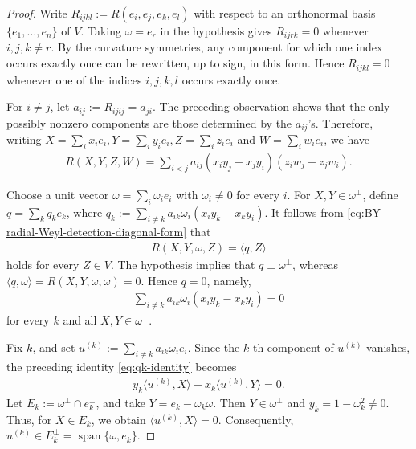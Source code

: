\documentclass[10pt,a4paper]{amsart}
\begin{document}
	\begin{proof}
		Write $R_{ijkl}:=R(e_i,e_j,e_k,e_l)$ with respect to an orthonormal
		basis $\{e_1,\ldots,e_n\}$ of $V$. Taking $\omega=e_r$ in the
		hypothesis gives $R_{ijrk}=0$ whenever $i,j,k\neq r$. By the curvature
		symmetries, any component for which one index occurs exactly once can
		be rewritten, up to sign, in this form. Hence $R_{ijkl}=0$ whenever
		one of the indices $i,j,k,l$ occurs exactly once.
		
		For $i\neq j$, let $a_{ij}:=R_{ijij}=a_{ji}$. The preceding observation
		shows that the only possibly nonzero components are those determined by
		the $a_{ij}$'s. Therefore, writing $X=\sum_i x_i e_i,Y=\sum_i y_i e_i,Z=\sum_i z_i e_i$ and $W=\sum_i w_i e_i$, we have
		\begin{align}
			\label{eq:BY-radial-Weyl-detection-diagonal-form}
			R(X,Y,Z,W)
			=
			\sum_{i<j}
			a_{ij}
			(x_i y_j-x_j y_i)
			(z_i w_j-z_j w_i).
		\end{align}
		
		Choose a unit vector $\omega=\sum_i\omega_i e_i$ with $\omega_i\neq0$
		for every $i$. For $X,Y\in\omega^\perp$, define
		$q=\sum_k q_k e_k$, where $q_k:=\sum_{i\neq k}a_{ik}\omega_i(x_i y_k-x_k y_i)$. It follows from
		\eqref{eq:BY-radial-Weyl-detection-diagonal-form} that
		\begin{align*}
			R(X,Y,\omega,Z)=\langle q,Z\rangle
		\end{align*}
		holds for every $Z\in V$. The hypothesis
		implies that $q\perp\omega^\perp$, whereas
		$\langle q,\omega\rangle=R(X,Y,\omega,\omega)=0$. Hence $q=0$, namely,
		\begin{align}\label{eq:qk-identity}
			\sum_{i\neq k}
			a_{ik}\omega_i
			(x_i y_k-x_k y_i)
			=
			0
		\end{align}
		for every $k$ and all $X,Y\in\omega^\perp$.
		
		Fix $k$, and set $u^{(k)}:=\sum_{i\neq k}a_{ik}\omega_i e_i$. Since the
		$k$-th component of $u^{(k)}$ vanishes, the preceding identity \eqref{eq:qk-identity} becomes
		\begin{align*}
			y_k\langle u^{(k)},X\rangle-x_k\langle u^{(k)},Y\rangle=0.
		\end{align*}
		Let
		$E_k:=\omega^\perp\cap e_k^\perp$, and take
		$Y=e_k-\omega_k\omega$. Then $Y\in\omega^\perp$ and
		$y_k=1-\omega_k^2\neq0$. Thus, for $X\in E_k$, we obtain
		$\langle u^{(k)},X\rangle=0$. Consequently,
		$u^{(k)}\in E_k^\perp=\operatorname{span}\{\omega,e_k\}$.
		

\end{proof}
\end{document}
